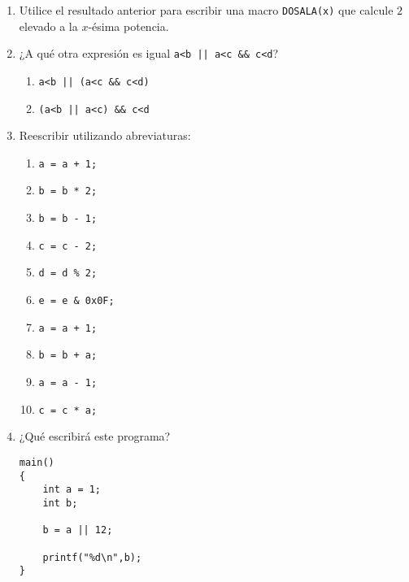\begin{enumerate}
\item Utilice el resultado anterior para escribir una macro \lstinline{DOSALA(x)} que calcule $2$ elevado a la $x$-ésima potencia.

\item ¿A qué otra expresión es igual \lstinline{a<b || a<c && c<d}?

\begin{enumerate}[label=\alph*.]
	\item \lstinline{a<b || (a<c && c<d)}
	\item \lstinline{(a<b || a<c) && c<d}
\end{enumerate}

\item Reescribir utilizando abreviaturas:
\begin{enumerate}[label=\alph*.]
	\item \lstinline{a = a + 1;}
	\item \lstinline{b = b * 2;}
	\item \lstinline{b = b - 1;}
	\item \lstinline{c = c - 2;}
	\item \lstinline{d = d % 2;}
	\item \lstinline{e = e & 0x0F;}
	\item \lstinline{a = a + 1;}
	\item \lstinline{b = b + a;}
	\item \lstinline{a = a - 1;}
	\item \lstinline{c = c * a;}
\end{enumerate}

\item ¿Qué escribirá este programa?
\begin{lstlisting}
main()
{
	int a = 1;
	int b;

	b = a || 12;

	printf("%d\n",b);
}

\end{lstlisting}
\end{enumerate}


